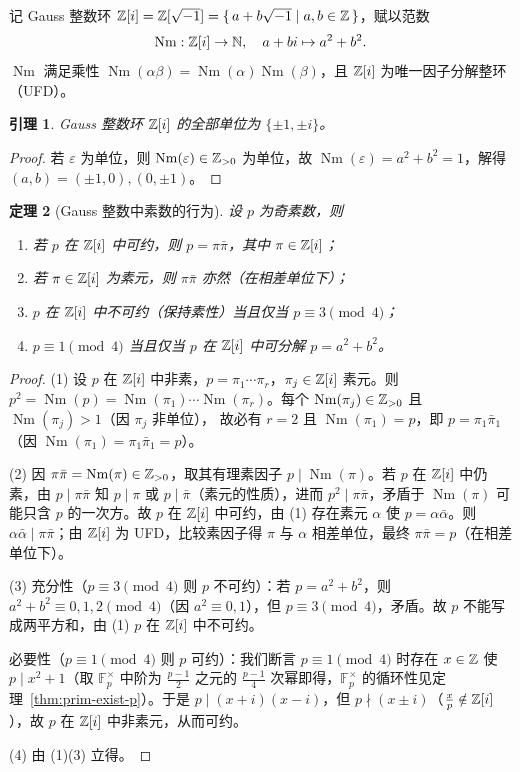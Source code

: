 \documentclass{article}
\newcommand{\Nm}{\operatorname{Nm}}
\theoremstyle{plain}
\newtheorem{thm}{定理}[section]
\newtheorem{lem}[thm]{引理}
\theoremstyle{definition}
\theoremstyle{remark}
\begin{document}
记 Gauss 整数环 $\mathbb{Z}[i]=\mathbb{Z}[\sqrt{-1}]=\{\,a+b\sqrt{-1}\mid a,b\in\mathbb{Z}\,\}$，赋以范数
\[
  \Nm:\Z[i]\to\N,\quad a+b i\mapsto a^2+b^2.
\]
$\Nm$ 满足乘性 $\Nm(\alpha\beta)=\Nm(\alpha)\Nm(\beta)$，且 $\mathbb{Z}[i]$ 为唯一因子分解整环（UFD）。

\begin{lem}\label{lem:gauss-unit}
  Gauss 整数环 $\mathbb{Z}[i]$ 的全部单位为 $\{\pm1,\pm i\}$。
\end{lem}

\begin{proof}
  若 $\varepsilon$ 为单位，则 $\Nm(\varepsilon)\in\Z_{>0}$ 为单位，故 $\Nm(\varepsilon)=a^2+b^2=1$，解得 $(a,b)=(\pm1,0),(0,\pm1)$。
\end{proof}

\begin{thm}[Gauss 整数中素数的行为]\label{thm:sum2sq-prime}
  设 $p$ 为奇素数，则
  \begin{enumerate}[(1)]
    \item 若 $p$ 在 $\mathbb{Z}[i]$ 中可约，则 $p=\pi\bar\pi$，其中 $\pi\in\mathbb{Z}[i]$；
    \item 若 $\pi\in\mathbb{Z}[i]$ 为素元，则 $\pi\bar\pi$ 亦然（在相差单位下）；
    \item $p$ 在 $\mathbb{Z}[i]$ 中不可约（保持素性）当且仅当 $p\equiv3\pmod4$；
    \item $p\equiv1\pmod4$ 当且仅当 $p$ 在 $\mathbb{Z}[i]$ 中可分解 $p=a^2+b^2$。
  \end{enumerate}
\end{thm}

\begin{proof}
  (1) 设 $p$ 在 $\mathbb{Z}[i]$ 中非素，$p=\pi_1\cdots\pi_r$，$\pi_j\in\mathbb{Z}[i]$ 素元。则
  $p^2=\Nm(p)=\Nm(\pi_1)\cdots\Nm(\pi_r)$。每个 $\Nm(\pi_j)\in\Z_{>0}$ 且 $\Nm(\pi_j)>1$（因 $\pi_j$ 非单位），
  故必有 $r=2$ 且 $\Nm(\pi_1)=p$，即 $p=\pi_1\bar\pi_1$（因 $\Nm(\pi_1)=\pi_1\bar\pi_1=p$）。

  (2) 因 $\pi\bar\pi=\Nm(\pi)\in\Z_{>0}$，取其有理素因子 $p\mid\Nm(\pi)$。若 $p$ 在 $\mathbb{Z}[i]$ 中仍素，由 $p\mid\pi\bar\pi$ 知 $p\mid\pi$ 或 $p\mid\bar\pi$（素元的性质），进而 $p^2\mid\pi\bar\pi$，矛盾于 $\Nm(\pi)$ 可能只含 $p$ 的一次方。故 $p$ 在 $\mathbb{Z}[i]$ 中可约，由 (1) 存在素元 $\alpha$ 使 $p=\alpha\bar\alpha$。则 $\alpha\bar\alpha\mid\pi\bar\pi$；由 $\mathbb{Z}[i]$ 为 UFD，比较素因子得 $\pi$ 与 $\alpha$ 相差单位，最终 $\pi\bar\pi=p$（在相差单位下）。

  (3) 充分性（$p\equiv3\pmod4$ 则 $p$ 不可约）：若 $p=a^2+b^2$，则 $a^2+b^2\equiv0,1,2\pmod4$（因 $a^2\equiv0,1$），但 $p\equiv3\pmod4$，矛盾。故 $p$ 不能写成两平方和，由 (1) $p$ 在 $\mathbb{Z}[i]$ 中不可约。

  必要性（$p\equiv1\pmod4$ 则 $p$ 可约）：我们断言 $p\equiv1\pmod4$ 时存在 $x\in\mathbb{Z}$ 使 $p\mid x^2+1$（取 $\mathbb{F}_p^\times$ 中阶为 $\tfrac{p-1}{2}$ 之元的 $\tfrac{p-1}{4}$ 次幂即得，$\mathbb{F}_p^\times$ 的循环性见定理~\ref{thm:prim-exist-p}）。于是 $p\mid(x+i)(x-i)$，但 $p\nmid(x\pm i)$（$\tfrac{x}{p}\notin\mathbb{Z}[i]$），故 $p$ 在 $\mathbb{Z}[i]$ 中非素元，从而可约。

  (4) 由 (1)(3) 立得。
\end{proof}
\end{document}

